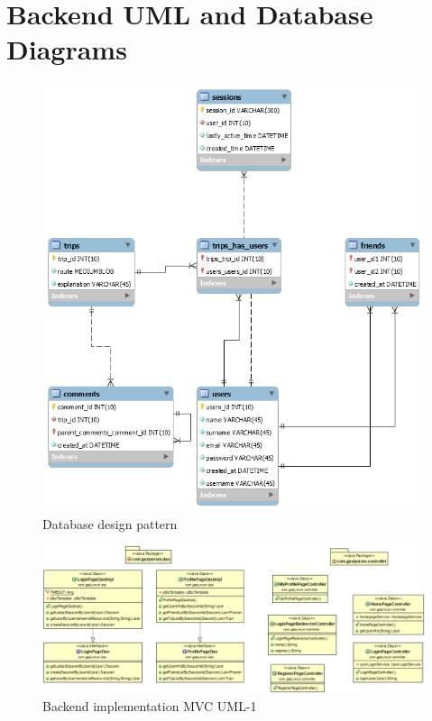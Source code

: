 \newpage 
\section{Backend UML and Database Diagrams}

\begin{figure}[!htbp]
\centering
\includegraphics[width=\textwidth]{projectChapters/images/databaseDesign.png}
\caption{Database design pattern}
\end{figure}
 
 
\begin{figure}[!htbp]
\centering
\includegraphics[width=\textwidth]{projectChapters/images/backend1.png}
\caption{Backend implementation MVC UML-1}
\end{figure}

